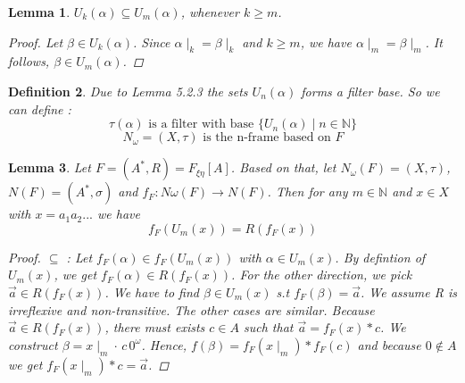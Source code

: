 \documentclass[12pt, a4paper]{scrartcl}
\newtheorem{definition}{Definition}[subsection]
\newtheorem{lemma}[definition]{Lemma}
\begin{document}
\begin{lemma}
    $U_k(\alpha) \subseteq U_m(\alpha)$, whenever $k \geq m$.
    
    \begin{proof}
        Let $\beta \in U_k(\alpha)$. Since $\alpha \mid_k = \beta \mid_k$ and $k \geq m$, we have $\alpha \mid_m = \beta \mid_m$. It follows, $\beta \in U_m(\alpha)$.
    \end{proof}
\end{lemma}

\begin{definition}
    Due to Lemma 5.2.3 the sets $U_n(\alpha)$ forms a filter base. So we can define :
    $$\tau(\alpha) \mbox{ is a filter with base } \{U_n(\alpha) \mid n \in \mathbb{N} \}$$
    $$N_\omega = (X, \tau) \mbox{ is the n-frame based on } F$$

\end{definition}

\begin{lemma}
    Let $F = (A^*, R) = F_{\xi \eta}[A]$. Based on that, let $N_\omega(F) = (X,\tau)$, $N(F) = (A^*, \sigma)$ and $f_F : N\omega(F) \rightarrow N(F)$.
    Then for any $m \in \mathbb{N}$ and $x\in X$ with $x = a_1a_2...$ \newline we have $$f_F(U_m(x)) = R(f_F(x))$$
    \vspace{0.01cm}
    \begin{proof}
            $\subseteq$ : Let $f_F(\alpha) \in f_F(U_m(x))$ with $\alpha \in U_m(x)$. By defintion of $U_m(x)$,
            we get $f_F(\alpha) \in R(f_F(x))$. \newline \newline
            For the other direction, we pick $\vec{a} \in R(f_F(x))$. We have to find $\beta \in U_m(x)$ s.t $f_F(\beta) = \vec{a}$. We assume R is irreflexive and non-transitive.
            The other cases are similar. \newline
            Because $\vec{a} \in R(f_F(x))$, there must exists $c \in A$ such that $ \vec{a} = f_F(x) * c $.
            We construct $\beta = x \mid_m \cdot \, c\, 0^\omega$. Hence, $f(\beta) = f_F(x \mid_m) * f_F(c)$ and because $ 0 \notin A$ we get $f_F(x \mid_m) * c = \vec{a}$.
            
            
    \end{proof}
\end{lemma}
\end{document}
